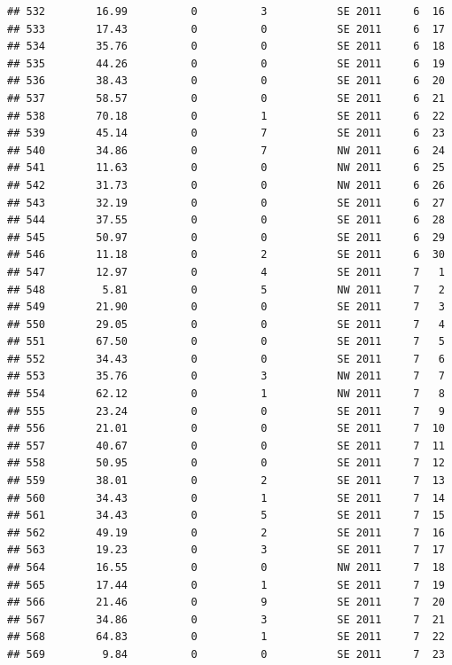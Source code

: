 \documentclass[
]{article}
\begin{document}
\begin{verbatim}
## 532        16.99          0          3           SE 2011     6  16
## 533        17.43          0          0           SE 2011     6  17
## 534        35.76          0          0           SE 2011     6  18
## 535        44.26          0          0           SE 2011     6  19
## 536        38.43          0          0           SE 2011     6  20
## 537        58.57          0          0           SE 2011     6  21
## 538        70.18          0          1           SE 2011     6  22
## 539        45.14          0          7           SE 2011     6  23
## 540        34.86          0          7           NW 2011     6  24
## 541        11.63          0          0           NW 2011     6  25
## 542        31.73          0          0           NW 2011     6  26
## 543        32.19          0          0           SE 2011     6  27
## 544        37.55          0          0           SE 2011     6  28
## 545        50.97          0          0           SE 2011     6  29
## 546        11.18          0          2           SE 2011     6  30
## 547        12.97          0          4           SE 2011     7   1
## 548         5.81          0          5           NW 2011     7   2
## 549        21.90          0          0           SE 2011     7   3
## 550        29.05          0          0           SE 2011     7   4
## 551        67.50          0          0           SE 2011     7   5
## 552        34.43          0          0           SE 2011     7   6
## 553        35.76          0          3           NW 2011     7   7
## 554        62.12          0          1           NW 2011     7   8
## 555        23.24          0          0           SE 2011     7   9
## 556        21.01          0          0           SE 2011     7  10
## 557        40.67          0          0           SE 2011     7  11
## 558        50.95          0          0           SE 2011     7  12
## 559        38.01          0          2           SE 2011     7  13
## 560        34.43          0          1           SE 2011     7  14
## 561        34.43          0          5           SE 2011     7  15
## 562        49.19          0          2           SE 2011     7  16
## 563        19.23          0          3           SE 2011     7  17
## 564        16.55          0          0           NW 2011     7  18
## 565        17.44          0          1           SE 2011     7  19
## 566        21.46          0          9           SE 2011     7  20
## 567        34.86          0          3           SE 2011     7  21
## 568        64.83          0          1           SE 2011     7  22
## 569         9.84          0          0           SE 2011     7  23

\end{verbatim}
\end{document}
